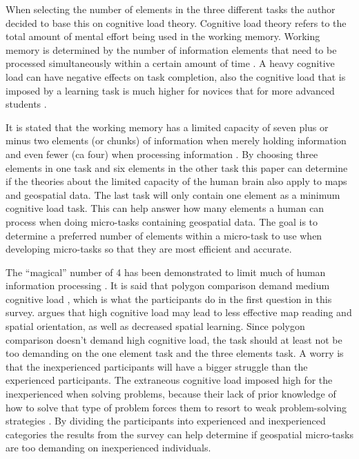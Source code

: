 When selecting the number of elements in the three different tasks the author decided to base this on cognitive load theory. Cognitive load theory refers to the total amount of mental effort being used in the working memory. Working memory is determined by the number of information elements that need to be processed simultaneously within a certain amount of time \citep{Barrouillet2007}. A heavy cognitive load can have negative effects on task completion, also the cognitive load that is imposed by a learning task is much higher for novices that for more advanced students \citep{Leppink2014a}.  

It is stated that the working memory has a limited capacity of seven plus or minus two elements (or chunks) of information when merely holding information and even fewer (ca four) when processing information \citep{Leppink2014a}. By choosing three elements in one task and six elements in the other task this paper can determine if the theories about the limited capacity of the human brain also apply to maps and geospatial data. The last task will only contain one element as a minimum cognitive load task. This can help answer how many elements a human can process when doing micro-tasks containing geospatial data. The goal is to determine a preferred number of elements within a micro-task to use when developing micro-tasks so that they are most efficient and accurate.

The “magical” number of 4 has been demonstrated to limit much of human information processing \citep{Mandler2013}. It is said that polygon comparison demand medium cognitive load \citep{Kiefer2016}, which is what the participants do in the first question in this survey. \cite{Kiefer2016} argues that high cognitive load may lead to less effective map reading and spatial orientation, as well as decreased spatial learning. Since polygon comparison doesn't demand high cognitive load, the task should at least not be too demanding on the one element task and the three elements task. A worry is that the inexperienced participants will have a bigger struggle than the experienced participants. The extraneous cognitive load imposed high for the inexperienced when solving problems, because their lack of prior knowledge of how to solve that type of problem forces them to resort to weak problem-solving strategies \citep{Leppink2014a}. By dividing the participants into experienced and inexperienced categories the results from the survey can help determine if geospatial micro-tasks are too demanding on inexperienced individuals. 

